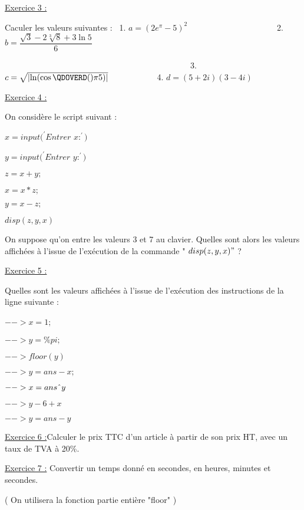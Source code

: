 \documentclass{article}
\begin{document}
\bigskip

\underline{Exercice 3 :}

Caculer les valeurs suivantes : \ 1. $a=(2e^{\pi }-5)^{2}$ \ \ \ \ \ \ \ \ \
\ \ \ \ \ \ \ \ \ \ \ \ 2. $b=\dfrac{\sqrt{3}-2\sqrt[3]{8}+3\ln 5}{6}$ \ \ 

\ \ \ \ \ \ \ \ \ \ \ \ \ \ \ \ \ \ \ \ \ \ \ \ \ \ \ \ \ \ \ \ \ \ \ \ \ \
\ \ \ \ \ \ \ 3. \ $c=\sqrt{\left\vert \ln (\cos \QDOVERD( ) {\pi
}{5})\right\vert }$ \ \ \ \ \ \ \ \ \ \ \ 4. $d=(5+2i)(3-4i)$

\underline{Exercice 4 :}

On consid\`{e}re le script suivant :

$x=input(^{\prime }Entrer$ $x:^{\prime })$

$y=input(^{\prime }Entrer$ $y:^{\prime })$

$z=x+y;$

$x=x\ast z;$

$y=x-z;$

$disp(z,y,x)$

On suppose qu'on entre les valeurs 3 et 7 au clavier. Quelles sont alors les
valeurs affich\'{e}es \`{a} l'issue de l'ex\'{e}cution de la commande " $%
disp(z,y,x)"$ ?

\underline{Exercice 5 :}

Quelles sont les valeurs affich\'{e}es \`{a} l'issue de l'ex\'{e}cution des
instructions de la ligne suivante :

$-->x=1;$ $\ $ $\ $

$-->y=\%pi;$

$-->floor(y)$

$-->y=ans-x;$

$-->x=ans\symbol{94}y$

$-->y-6+x$

$-->y=ans-y$

\underline{Exercice 6 :}Calculer le prix TTC d'un article \`{a} partir de
son prix HT, avec un taux de TVA \`{a} 20\%.

\underline{Exercice 7 :} Convertir un temps donn\'{e} en secondes, en
heures, minutes et secondes.

( On utilisera la fonction partie enti\`{e}re "floor" )
\end{document}
